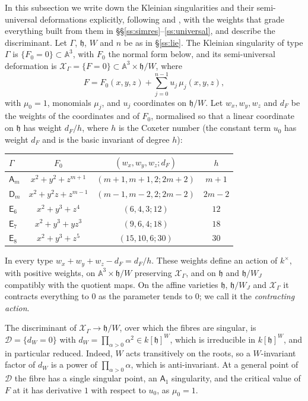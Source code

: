 \documentclass[11pt]{amsart}
\numberwithin{table}{section}
\numberwithin{figure}{section}
\numberwithin{equation}{section}
\theoremstyle{definition}
\theoremstyle{plain}
\newcommand{\cX}{\mathcal{X}}
\newcommand{\h}{\mathfrak{h}}
\newcommand{\A}{\mathbb{A}}
\begin{document}
In this subsection we write down the Kleinian singularities and their semi-universal deformations explicitly, following \cite[\S\S6, 8]{Slo} and \cite[\S3, Tables~2, 3]{KM}, with the weights that grade everything built from them in \S\S\ref{ss:simres}--\ref{ss:universal}, and describe the discriminant. Let $\Gamma$, $\h$, $W$ and $n$ be as in \S\ref{ss:lie}. The Kleinian singularity of type $\Gamma$ is $\{F_0 = 0\} \subset \A^3$, with $F_0$ the normal form below, and its semi-universal deformation is $\cX_\Gamma = \{F = 0\} \subset \A^3 \times \h/W$, where
\[
F = F_0(x, y, z) + \sum_{j=0}^{n-1} u_j\,\mu_j(x, y, z),
\]
with $\mu_0 = 1$, monomials $\mu_j$, and $u_j$ coordinates on $\h/W$. Let $w_x, w_y, w_z$ and $d_F$ be the weights of the coordinates and of $F_0$, normalised so that a linear coordinate on $\h$ has weight $d_F/h$, where $h$ is the Coxeter number (the constant term $u_0$ has weight $d_F$ and is the basic invariant of degree $h$):
\begin{center}
\begin{tabular}{@{}lccc@{}}
\toprule
$\Gamma$ & $F_0$ & $(w_x, w_y, w_z; d_F)$ & $h$ \\
\midrule
$\mathsf{A}_{m}$ & $x^2 + y^2 + z^{m+1}$ & $(m+1, m+1, 2; 2m+2)$ & $m+1$ \\
$\mathsf{D}_m$ & $x^2 + y^2 z + z^{m-1}$ & $(m-1, m-2, 2; 2m-2)$ & $2m-2$ \\
$\mathsf{E}_6$ & $x^2 + y^3 + z^4$ & $(6, 4, 3; 12)$ & $12$ \\
$\mathsf{E}_7$ & $x^2 + y^3 + yz^3$ & $(9, 6, 4; 18)$ & $18$ \\
$\mathsf{E}_8$ & $x^2 + y^3 + z^5$ & $(15, 10, 6; 30)$ & $30$ \\
\bottomrule
\end{tabular}
\end{center}
In every type $w_x + w_y + w_z - d_F = d_F/h$. These weights define an action of $k^\times$, with positive weights, on $\A^3 \times \h/W$ preserving $\cX_\Gamma$, and on $\h$ and $\h/W_J$ compatibly with the quotient maps. On the affine varieties $\h$, $\h/W_J$ and $\cX_\Gamma$ it contracts everything to $0$ as the parameter tends to $0$; we call it the \emph{contracting action}.

The discriminant of $\cX_\Gamma \to \h/W$, over which the fibres are singular, is $\mathcal D = \{d_W = 0\}$ with $d_W = \prod_{\alpha>0}\alpha^2 \in k[\h]^W$, which is irreducible in $k[\h]^W$, and in particular reduced. Indeed, $W$ acts transitively on the roots, so a $W$-invariant factor of $d_W$ is a power of $\prod_{\alpha>0}\alpha$, which is anti-invariant. At a general point of $\mathcal D$ the fibre has a single singular point, an $\mathsf{A}_1$ singularity, and the critical value of $F$ at it has derivative $1$ with respect to $u_0$, as $\mu_0 = 1$.
\end{document}

